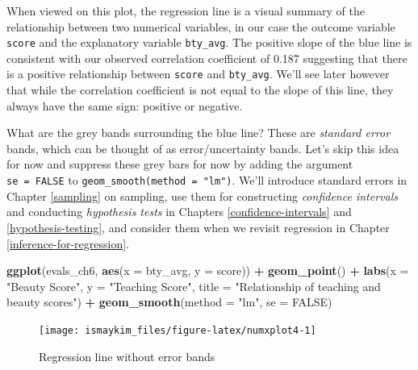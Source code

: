 \documentclass[12pt,]{krantz}
\makeatletter
\newenvironment{Shaded}{\begin{snugshade}}{\end{snugshade}}
\newcommand{\KeywordTok}[1]{\textcolor[rgb]{0.27,0.27,0.27}{\textbf{#1}}}
\newcommand{\DataTypeTok}[1]{\textcolor[rgb]{0.27,0.27,0.27}{#1}}
\newcommand{\StringTok}[1]{\textcolor[rgb]{0.5,0.5,0.5}{#1}}
\newcommand{\OtherTok}[1]{\textcolor[rgb]{0.37,0.37,0.37}{#1}}
\newcommand{\OperatorTok}[1]{\textcolor[rgb]{0.43,0.43,0.43}{\textbf{#1}}}
\newcommand{\NormalTok}[1]{#1}
\newenvironment{kframe}{%
\medskip{}
\setlength{\fboxsep}{.8em}
 \def\at@end@of@kframe{}%
 \ifinner\ifhmode%
  \def\at@end@of@kframe{\end{minipage}}%
  \begin{minipage}{\columnwidth}%
 \fi\fi%
 \def\FrameCommand##1{\hskip\@totalleftmargin \hskip-\fboxsep
 \colorbox{shadecolor}{##1}\hskip-\fboxsep
     \hskip-\linewidth \hskip-\@totalleftmargin \hskip\columnwidth}%
 \MakeFramed {\advance\hsize-\width
   \@totalleftmargin\z@ \linewidth\hsize
   \@setminipage}}%
 {\par\unskip\endMakeFramed%
 \at@end@of@kframe}
\renewenvironment{Shaded}{\begin{kframe}}{\end{kframe}}
\theoremstyle{definition}
\theoremstyle{definition}
\theoremstyle{definition}
\theoremstyle{remark}
\makeatother
\begin{document}
When viewed on this plot, the regression line is a visual summary of the
relationship between two numerical variables, in our case the outcome
variable \texttt{score} and the explanatory variable \texttt{bty\_avg}.
The positive slope of the blue line is consistent with our observed
correlation coefficient of 0.187 suggesting that there is a positive
relationship between \texttt{score} and \texttt{bty\_avg}. We'll see
later however that while the correlation coefficient is not equal to the
slope of this line, they always have the same sign: positive or
negative.

What are the grey bands surrounding the blue line? These are
\emph{standard error} bands, which can be thought of as
error/uncertainty bands. Let's skip this idea for now and suppress these
grey bars for now by adding the argument \texttt{se\ =\ FALSE} to
\texttt{geom\_smooth(method\ =\ "lm")}. We'll introduce standard errors
in Chapter \ref{sampling} on sampling, use them for constructing
\emph{confidence intervals} and conducting \emph{hypothesis tests} in
Chapters \ref{confidence-intervals} and \ref{hypothesis-testing}, and
consider them when we revisit regression in Chapter
\ref{inference-for-regression}.

\begin{Shaded}
\begin{Highlighting}[]
\KeywordTok{ggplot}\NormalTok{(evals_ch6, }\KeywordTok{aes}\NormalTok{(}\DataTypeTok{x =}\NormalTok{ bty_avg, }\DataTypeTok{y =}\NormalTok{ score)) }\OperatorTok{+}
\StringTok{  }\KeywordTok{geom_point}\NormalTok{() }\OperatorTok{+}
\StringTok{  }\KeywordTok{labs}\NormalTok{(}\DataTypeTok{x =} \StringTok{"Beauty Score"}\NormalTok{, }\DataTypeTok{y =} \StringTok{"Teaching Score"}\NormalTok{, }
       \DataTypeTok{title =} \StringTok{"Relationship of teaching and beauty scores"}\NormalTok{) }\OperatorTok{+}
\StringTok{  }\KeywordTok{geom_smooth}\NormalTok{(}\DataTypeTok{method =} \StringTok{"lm"}\NormalTok{, }\DataTypeTok{se =} \OtherTok{FALSE}\NormalTok{)}
\end{Highlighting}
\end{Shaded}

\begin{figure}

{\centering \texttt{[image: ismaykim\_files/figure-latex/numxplot4-1]} 

}

\caption{Regression line without error bands}\label{fig:numxplot4}
\end{figure}
\end{document}
